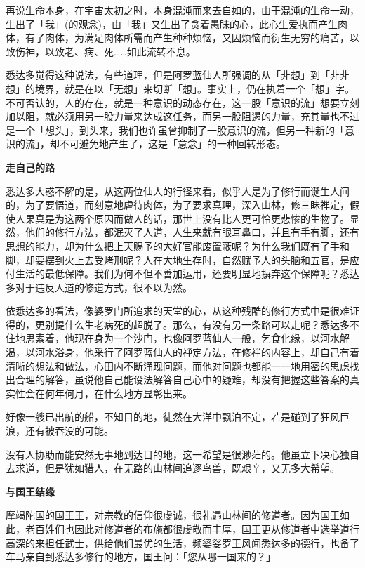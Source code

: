 \documentclass[twoside,openany]{book}
\newcommand{\mt}[1]{\textbullet \textbf{#1}}
\begin{document}
再说生命本身，在宇宙太初之时，本身混沌而来去自如的，由于混沌的生命一动，生出了「我」(的观念)，由「我」又生出了贪着愚眛的心，此心生爱执而产生肉体，有了肉体，为满足肉体所需而产生种种烦恼，又因烦恼而衍生无穷的痛苦，以致伤神，以致老、病、死……如此流转不息。

悉达多觉得这种说法，有些道理，但是阿罗蓝仙人所强调的从「非想」到「非非想」的境界，就是在以「无想」来切断「想」。事实上，仍在执着一个「想」字。不可否认的，人的存在，就是一种意识的动态存在，这一股「意识的流」想要立刻加以阻，就必须用另一股力量来达成这任务，而另一股阻遏的力量，充其量也不过是一个「想头」，到头来，我们也许虽曾抑制了一股意识的流，但另一种新的「意识的流」，却不可避免地产生了，这是「意念」的一种回转形态。

\mt{走自己的路}

悉达多大惑不解的是，从这两位仙人的行径来看，似乎人是为了修行而诞生人间的，为了要悟道，而刻意地虐待肉体，为了要求真理，深入山林，修三眛禅定，假使人果真是为这两个原因而做人的话，那世上没有比人更可怜更悲惨的生物了。显然，他们的修行方法，都泯灭了人道，人生来就有眼耳鼻口，并且有手有脚，还有思想的能力，却为什么把上天赐予的大好官能废置蔽呢？为什么我们既有了手和脚，却要摆到火上去受烤刑呢？人在大地生存时，自然赋予人的头脑和五官，是应付生活的最低保障。我们为何不但不善加运用，还要明显地摒弃这个保障呢？悉达多对于违反人道的修道方式，很不以为然。

依悉达多的看法，像婆罗门所追求的天堂的心，从这种残酷的修行方式中是很难证得的，更别提什么生老病死的超脱了。那么，有没有另一条路可以走呢？悉达多不住地思索着，他现在身为一个沙门，也像阿罗蓝仙人一般，乞食化缘，以河水解渴，以河水浴身，他采行了阿罗蓝仙人的禅定方法，在修禅的内容上，却自己有着清晰的想法和做法，心田内不断涌现问题，而他对问题也都能一一地用密的思虑找出合理的解答，虽说他自己能设法解答自己心中的疑难，却没有把握这些答案的真实性会在何年何月，在什么地方显彰出来。

好像一艘已出航的船，不知目的地，徒然在大洋中飘泊不定，若是碰到了狂风巨浪，还有被吞没的可能。

没有人协助而能安然无事地到达目的地，这一希望是很渺茫的。他虽立下决心独自去求道，但是犹如猎人，在无路的山林间追逐鸟兽，既艰辛，又无多大希望。

\mt{与国王结缘}

摩竭陀国的国王王，对宗教的信仰很虔诚，很礼遇山林间的修道者。因为国王如此，老百姓们也因此对修道者的布施都很虔敬而丰厚，国王更从修道者中选举道行高深的来担任武士，供给他们最优的生活，频婆娑罗王风闻悉达多的德行，也备了车马亲自到悉达多修行的地方，国王问：「您从哪一国来的？」
\end{document}
